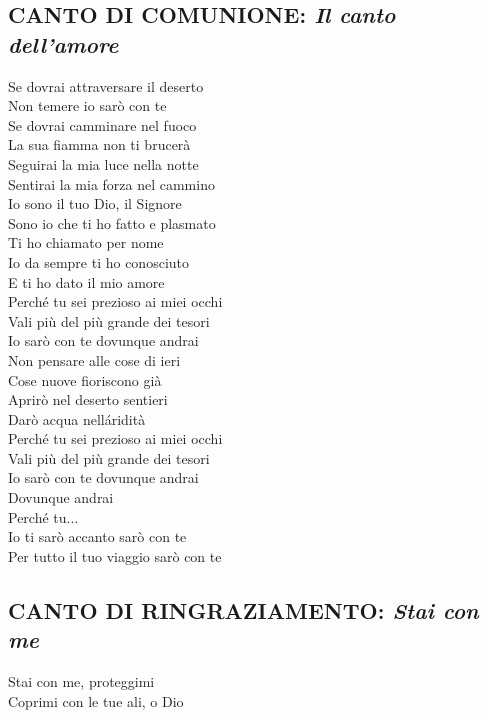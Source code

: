 \subsection*{CANTO DI COMUNIONE: \textit{Il canto dell'amore}}

	\begin{mystrofe}
		Se dovrai attraversare il deserto \\
		Non temere io sarò con te \\
		Se dovrai camminare nel fuoco \\
		La sua fiamma non ti brucerà \\
		Seguirai la mia luce nella notte \\
		Sentirai la mia forza nel cammino \\
		Io sono il tuo Dio, il Signore \\
		Sono io che ti ho fatto e plasmato \\
		Ti ho chiamato per nome \\
		Io da sempre ti ho conosciuto \\
		E ti ho dato il mio amore \\
		Perché tu sei prezioso ai miei occhi \\
		Vali più del più grande dei tesori \\
		Io sarò con te dovunque andrai \\
		Non pensare alle cose di ieri \\
		Cose nuove fioriscono già \\
		Aprirò nel deserto sentieri \\
		Darò acqua nell\'aridità \\
		Perché tu sei prezioso ai miei occhi \\
		Vali più del più grande dei tesori \\
		Io sarò con te dovunque andrai \\
		Dovunque andrai \\
		Perché tu... \\
		Io ti sarò accanto sarò con te \\
		Per tutto il tuo viaggio sarò con te
	\end{mystrofe}

\subsection*{CANTO DI RINGRAZIAMENTO: \textit{Stai con me}}

	\begin{mystrofe}
		Stai con me, proteggimi \\
		Coprimi con le tue ali, o Dio \\
	\end{mystrofe}

